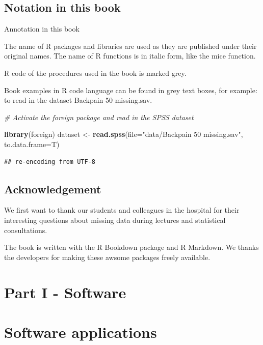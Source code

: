 \documentclass[]{book}
\newenvironment{Shaded}{\begin{snugshade}}{\end{snugshade}}
\newcommand{\KeywordTok}[1]{\textcolor[rgb]{0.13,0.29,0.53}{\textbf{#1}}}
\newcommand{\DataTypeTok}[1]{\textcolor[rgb]{0.13,0.29,0.53}{#1}}
\newcommand{\StringTok}[1]{\textcolor[rgb]{0.31,0.60,0.02}{#1}}
\newcommand{\CommentTok}[1]{\textcolor[rgb]{0.56,0.35,0.01}{\textit{#1}}}
\newcommand{\NormalTok}[1]{#1}
\begin{document}
\section{Notation in this book}\label{notation-in-this-book}

Annotation in this book

The name of R packages and libraries are used as they are published
under their original names. The name of R functions is in italic form,
like the mice function.

R code of the procedures used in the book is marked grey.

Book examples in R code language can be found in grey text boxes, for
example: to read in the dataset Backpain 50 missing.sav.

\begin{Shaded}
\begin{Highlighting}[]
\CommentTok{# Activate the foreign package and read in the SPSS dataset}

\KeywordTok{library}\NormalTok{(foreign)}
\NormalTok{dataset <-}\StringTok{ }\KeywordTok{read.spss}\NormalTok{(}\DataTypeTok{file=}\StringTok{"data/Backpain 50 missing.sav"}\NormalTok{, }\DataTypeTok{to.data.frame=}\NormalTok{T)}
\end{Highlighting}
\end{Shaded}

\begin{verbatim}
## re-encoding from UTF-8
\end{verbatim}

\section{Acknowledgement}\label{acknowledgement}

We first want to thank our students and colleagues in the hospital for
their interesting questions about missing data during lectures and
statistical consultations.

The book is written with the R Bookdown package and R Markdown. We
thanks the developers for making these awsome packages freely available.

\chapter*{Part I - Software}\label{part-i---software}

\chapter{Software applications}\label{software-applications}
\end{document}
